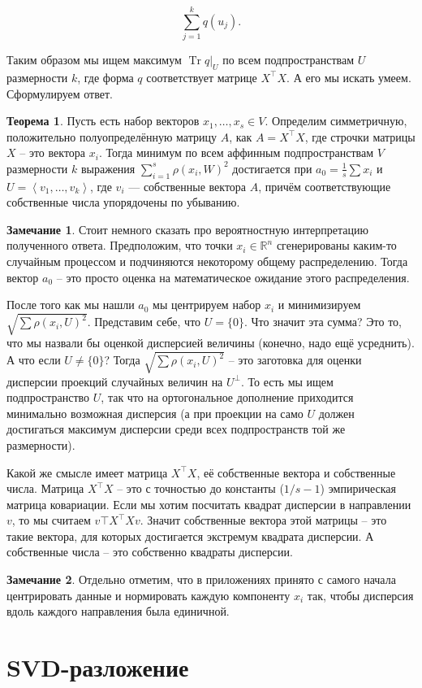 \documentclass[10pt,a4paper,oneside]{book}
\theoremstyle{definition}
\newtheorem*{rem}{\color{green!50!blue}Замечание}
\newtheorem{thm}{\color{red!40!black}Теорема}
\newcommand{\mb}[1]{\mathbb{#1}}
\newcommand{\Tr}{\operatorname{Tr}}
\def\lan{\left\langle }
\def\ran{\right\rangle}
\def\thrm{\begin{thm}}
\def\ethrm{\end{thm}}
\def\rm{\begin{rem}}
\def\erm{\end{rem}}
\begin{document}
$$\sum_{j=1}^k q(u_j).$$

Таким образом мы ищем максимум $\Tr q|_{U}$ по всем подпространствам $U$ размерности $k$, где форма $q$ соответствует матрице $X^{\top} X$. А его мы искать умеем. Сформулируем  ответ. 


\thrm  Пусть есть набор векторов $x_1,\dots,x_s \in V$. Определим симметричную, положительно полуопределённую матрицу $A$, как $A=X^{\top}X$, где строчки матрицы $X$ -- это вектора $x_i$. Тогда минимум по всем аффинным подпространствам $V$ размерности $k$ выражения $\sum_{i=1}^s \rho(x_i,W)^2$ достигается при $a_0=\frac{1}{s}\sum x_i$  и $U=\lan v_1,\dots,v_k\ran$, где $v_i$ --- собственные вектора $A$, причём соответствующие собственные числа упорядочены по убыванию. 
\ethrm

\rm Стоит немного сказать про вероятностную интерпретацию полученного ответа. Предположим, что точки $x_i\in \mb R^n$ сгенерированы каким-то случайным процессом и подчиняются некоторому общему распределению. Тогда вектор $a_0$ -- это просто оценка на математическое ожидание этого распределения.

После того как мы нашли $a_0$ мы центрируем набор $x_i$ и минимизируем $\sqrt{\sum \rho (x_i, U)^2}$. Представим себе, что $U=\{0\}$. Что значит эта сумма? Это то, что мы назвали бы оценкой дисперсией величины (конечно, надо ещё усреднить). 
А что если $U \neq \{0\}$? Тогда $\sqrt{\sum \rho (x_i, U)^2}$ -- это заготовка для оценки дисперсии проекций случайных величин на $U^\bot$. То есть мы ищем подпространство $U$, так что на ортогональное дополнение приходится минимально возможная дисперсия (а при проекции на само $U$ должен достигаться максимум дисперсии среди всех подпространств той же размерности).

Какой же смысле имеет матрица $X^\top X$, её собственные вектора и собственные числа. Матрица $X^\top X$ -- это с точностью до константы ($1/s-1$) эмпирическая матрица ковариации. Если мы хотим посчитать квадрат дисперсии в направлении $v$, то мы считаем $v\top X^\top X v$. Значит собственные вектора этой матрицы -- это такие вектора, для которых достигается экстремум квадрата дисперсии. А собственные числа -- это собственно квадраты дисперсии.
\erm

\rm Отдельно отметим, что в приложениях принято с самого начала центрировать данные и нормировать каждую компоненту $x_i$ так, чтобы дисперсия вдоль каждого направления была единичной.
\erm



\section{SVD-разложение}
\end{document}
